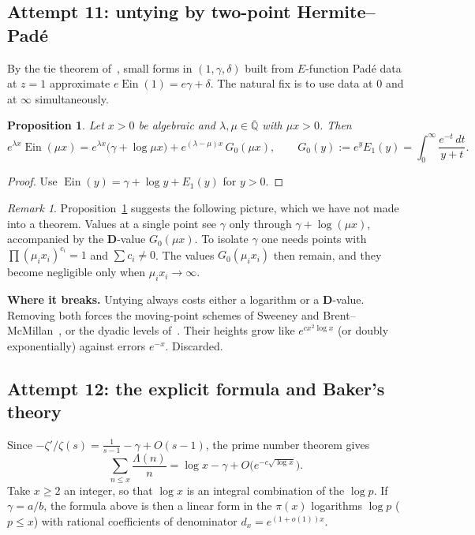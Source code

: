 \documentclass[11pt,a4paper]{article}
\newtheorem{proposition}[theorem]{Proposition}
\theoremstyle{definition}
\theoremstyle{remark}
\newtheorem{remark}[theorem]{Remark}
\newcommand{\Qbar}{\overline{\mathbb Q}}
\newcommand{\bD}{\mathbf D}
\DeclareMathOperator{\Ein}{Ein}
\numberwithin{equation}{section}
\begin{document}
\subsection{Attempt 11: untying by two-point Hermite--Pad\'e}

By the tie theorem of~\cite{p4:K1}, small forms in $(1,\gamma,\delta)$ built from $E$-function Pad\'e data at $z=1$ approximate $e\Ein(1)=e\gamma+\delta$. The natural fix is to use data at $0$ and at $\infty$ simultaneously.

\begin{proposition}\label{p4:prop:untie}
Let $x>0$ be algebraic and $\lambda,\mu\in\Qbar$ with $\mu x>0$. Then
\[
e^{\lambda x}\Ein(\mu x)=e^{\lambda x}\bigl(\gamma+\log\mu x\bigr)+e^{(\lambda-\mu)x}\,G_0(\mu x),\qquad G_0(y):=e^{y}E_1(y)=\int_0^\infty\frac{e^{-t}\,dt}{y+t}.
\]
\end{proposition}

\begin{proof}
Use $\Ein(y)=\gamma+\log y+E_1(y)$ for $y>0$.
\end{proof}

\begin{remark}
Proposition~\ref{p4:prop:untie} suggests the following picture, which we have not made into a theorem. Values at a single point see $\gamma$ only through $\gamma+\log(\mu x)$, accompanied by the $\bD$-value $G_0(\mu x)$. To isolate $\gamma$ one needs points with $\prod(\mu_ix_i)^{c_i}=1$ and $\sum c_i\ne0$. The values $G_0(\mu_ix_i)$ then remain, and they become negligible only when $\mu_ix_i\to\infty$.
\end{remark}

\noindent\textbf{Where it breaks.} Untying always costs either a logarithm or a $\bD$-value. Removing both forces the moving-point schemes of Sweeney and Brent--McMillan~\cite{p4:BM}, or the dyadic levels of~\cite{p4:K5}. Their heights grow like $e^{cx^2\log x}$ (or doubly exponentially) against errors $e^{-x}$. Discarded.

\subsection{Attempt 12: the explicit formula and Baker's theory}

Since $-\zeta'/\zeta(s)=\frac1{s-1}-\gamma+O(s-1)$, the prime number theorem gives
\[
\sum_{n\le x}\frac{\Lambda(n)}n=\log x-\gamma+O\bigl(e^{-c\sqrt{\log x}}\bigr).
\]
Take $x\ge2$ an integer, so that $\log x$ is an integral combination of the $\log p$. If $\gamma=a/b$, the formula above is then a linear form in the $\pi(x)$ logarithms $\log p$ ($p\le x$) with rational coefficients of denominator $d_x=e^{(1+o(1))x}$.
\end{document}
